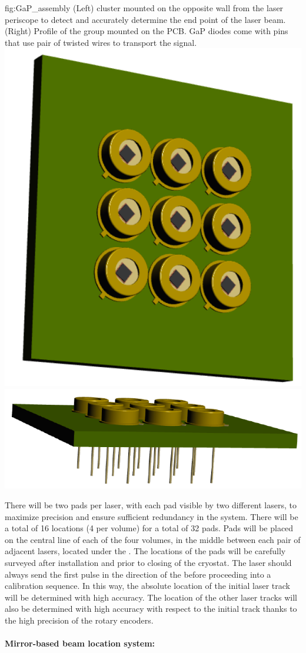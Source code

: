 \begin{dunefigure}{fig:GaP_assembly}
{(Left)  cluster mounted on the opposite wall from the laser periscope to detect and accurately determine the end point of the laser beam. (Right)
Profile of the  group mounted on the PCB. GaP diodes come with pins that use pair of twisted wires to transport the signal.}
\includegraphics[width=0.35\linewidth]{graphics/GaP_assembly.png} 
\includegraphics[width=0.45\linewidth]{graphics/GaP_assembly_profile.png} 
\end{dunefigure}


There will be two  pads per laser, with each pad visible by two different lasers, to maximize precision and ensure sufficient redundancy in the system. There will be a total of 16 locations (4 per volume) for a total of 32 pads. Pads will be placed on the central line of each of the four volumes, in the middle between each pair of adjacent lasers, located under the . The locations of the pads will be carefully surveyed after installation and prior to closing of the cryostat. The laser should always send the first pulse in the direction of the  before proceeding into a calibration sequence. In this way, the absolute location of the initial laser track will be determined with high accuracy. The location of the other laser tracks will also be determined with high accuracy with respect to the initial track thanks to the high precision of the rotary encoders.

\paragraph{Mirror-based beam location system:}

